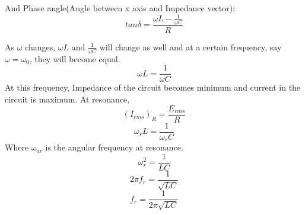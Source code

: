 And Phase angle(Angle between x axis and Impedance vector):
$$\textit{tan} \delta = \frac{\omega L - \frac{1}{\omega C}}{R}$$

As $\omega$ changes, $\omega L$ and $\frac{1}{\omega C}$ will change as well and at a certain frequency, say $\omega = \omega_{0}$, they will become equal.
$$\omega L = \frac{1}{\omega C}$$
At this frequency, Impedance of the circuit becomes minimum and current in the circuit is maximum. 
At resonance,
$$(I_{rms})_{R}=\frac{E_{rms}}{R}$$
$$\omega_{r} L = \frac{1}{\omega_{r} C}$$
Where $\omega_{ar}$ is the angular frequency at resonance.
$$\omega_{r}^2 = \frac{1}{LC}$$
$$2\pi f_{r} = \frac{1}{\sqrt{LC}}$$
$$f_{r} = \frac{1}{2\pi \sqrt{LC}}$$
